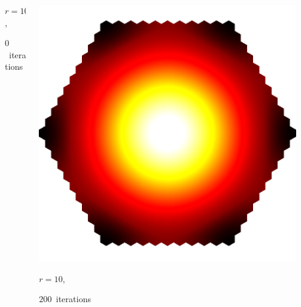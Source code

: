 \documentclass[aspectratio=169,t]{beamer}
\begin{document}
{\begin{columns}
\begin{column}{0.22\textwidth}
			{\footnotesize 
				\par \vspace{-1mm} $r=10$, 
				\par \vspace{-1mm} $0$~iterations
			}
		\end{column}
		\begin{column}{0.22\textwidth}
			\centering
			\includegraphics[width=.85\textwidth]{data/synthetic_meshes/hexagonal_tessellation_Dirac_delta_10_v1057_f1986_funcvals_200iter_crop.png}
			{\footnotesize 
				\par \vspace{-1mm} $r=10$, 
				\par \vspace{-1mm} $200$~iterations
			}
		\end{column}
		\begin{column}{0.17\textwidth}~\end{column}
	\end{columns}
}
\end{document}
